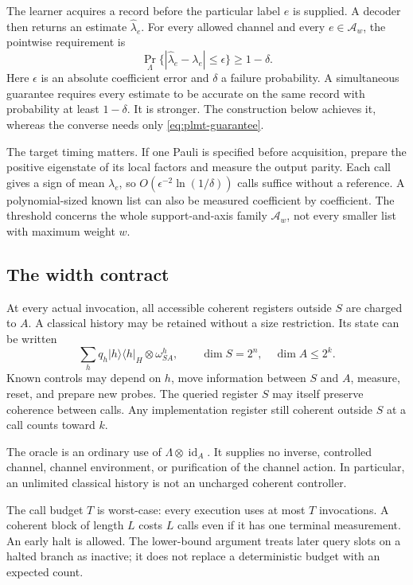 \documentclass[11pt,a4paper]{article}
\numberwithin{equation}{section}
\theoremstyle{definition}
\theoremstyle{remark}
\begin{document}
The learner acquires a record before the particular label \(e\) is supplied. A decoder then returns an estimate \(\widehat\lambda_e\). For every allowed channel and every \(e\in\mathcal A_w\), the pointwise requirement is
\begin{equation}
 \Pr_\Lambda\{|\widehat\lambda_e-\lambda_e|\leq\epsilon\}\geq1-\delta.
 \label{eq:plmt-guarantee}
\end{equation}
Here \(\epsilon\) is an absolute coefficient error and \(\delta\) a failure probability. A simultaneous guarantee requires every estimate to be accurate on the same record with probability at least \(1-\delta\). It is stronger. The construction below achieves it, whereas the converse needs only \eqref{eq:plmt-guarantee}.

The target timing matters. If one Pauli is specified before acquisition, prepare the positive eigenstate of its local factors and measure the output parity. Each call gives a sign of mean \(\lambda_e\), so \(O(\epsilon^{-2}\ln(1/\delta))\) calls suffice without a reference. A polynomial-sized known list can also be measured coefficient by coefficient. The threshold concerns the whole support-and-axis family \(\mathcal A_w\), not every smaller list with maximum weight \(w\).

\subsection{The width contract}
At every actual invocation, all accessible coherent registers outside \(S\) are charged to \(A\). A classical history may be retained without a size restriction. Its state can be written
\begin{equation}
 \sum_hq_h|h\rangle\langle h|_H\otimes\omega^h_{SA},
 \qquad \dim S=2^n,\quad \dim A\leq2^k.
 \label{eq:plmt-cut}
\end{equation}
Known controls may depend on \(h\), move information between \(S\) and \(A\), measure, reset, and prepare new probes. The queried register \(S\) may itself preserve coherence between calls. Any implementation register still coherent outside \(S\) at a call counts toward \(k\).

The oracle is an ordinary use of \(\Lambda\otimes\operatorname{id}_A\). It supplies no inverse, controlled channel, channel environment, or purification of the channel action. In particular, an unlimited classical history is not an uncharged coherent controller.

The call budget \(T\) is worst-case: every execution uses at most \(T\) invocations. A coherent block of length \(L\) costs \(L\) calls even if it has one terminal measurement. An early halt is allowed. The lower-bound argument treats later query slots on a halted branch as inactive; it does not replace a deterministic budget with an expected count.
\end{document}

